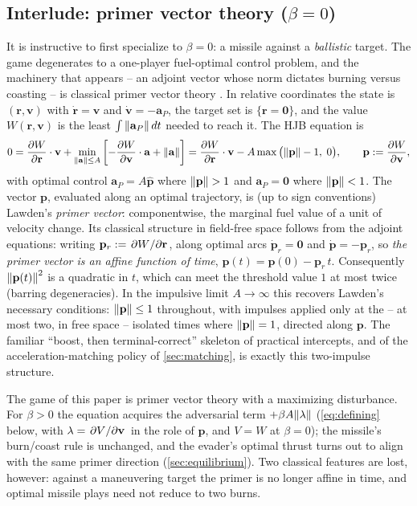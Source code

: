 \documentclass{article}
\newcommand{\eqdef}{:=}
\renewcommand{\vec}[1]{\mathbf{#1}}
\theoremstyle{remark}
\begin{document}
\subsection{Interlude: primer vector theory ($\beta = 0$)}
\label{sec:primer}

It is instructive to first specialize to $\beta = 0$: a missile against a
\emph{ballistic} target.  The game degenerates to a one-player fuel-optimal
control problem, and the machinery that appears -- an adjoint vector whose
norm dictates burning versus coasting -- is classical primer vector theory
\cite{lawden1963}.  In relative coordinates the state is $(\vec r, \vec v)$
with $\dot{\vec r} = \vec v$ and $\dot{\vec v} = -\vec a_P$, the target set
is $\{\vec r = \vec 0\}$, and the value $W(\vec r, \vec v)$ is the least
$\int \norm{\vec a_P}\, dt$ needed to reach it.  The HJB equation is
\[
  0 = \pdv{W}{\vec r}\cdot\vec v
  + \min_{\norm{\vec a} \le A} \left[ -\pdv{W}{\vec v}\cdot \vec a +
    \norm{\vec a} \right]
  = \pdv{W}{\vec r}\cdot\vec v - A \max\big( \norm{\vec p} - 1, \; 0 \big),
  \qquad \vec p \eqdef \pdv{W}{\vec v},
\]
with optimal control $\vec a_P = A\hat{\vec p}$ where $\norm{\vec p} > 1$ and
$\vec a_P = \vec 0$ where $\norm{\vec p} < 1$.  The vector $\vec p$,
evaluated along an optimal trajectory, is (up to sign conventions) Lawden's
\emph{primer vector}: componentwise, the marginal fuel value of a unit of
velocity change.  Its classical structure in field-free space follows from
the adjoint equations: writing $\vec p_r \eqdef \pdv*{W}{\vec r}$, along
optimal arcs $\dot{\vec p}_r = \vec 0$ and $\dot{\vec p} = -\vec p_r$, so
\emph{the primer vector is an affine function of time},
$\vec p(t) = \vec p(0) - \vec p_r\, t$.  Consequently $\norm{\vec p(t)}^2$ is
a quadratic in $t$, which can meet the threshold value $1$ at most twice
(barring degeneracies).  In the impulsive limit $A \to \infty$ this recovers
Lawden's necessary conditions: $\norm{\vec p} \le 1$ throughout, with
impulses applied only at the -- at most two, in free space -- isolated times
where $\norm{\vec p} = 1$, directed along $\vec p$.  The familiar ``boost,
then terminal-correct'' skeleton of practical intercepts, and of the
acceleration-matching policy of \cref{sec:matching}, is exactly this
two-impulse structure.

The game of this paper is primer vector theory with a maximizing
disturbance.  For $\beta > 0$ the equation acquires the adversarial term
$+\beta A \norm{\vec\lambda}$ (\cref{eq:defining} below, with
$\vec\lambda = \pdv*{V}{\vec v}$ in the role of $\vec p$, and $V = W$ at
$\beta = 0$); the missile's burn/coast rule is unchanged, and the evader's
optimal thrust turns out to align with the same primer direction
(\cref{sec:equilibrium}).  Two classical features are lost, however: against
a maneuvering target the primer is no longer affine in time, and optimal
missile plays need not reduce to two burns.
\end{document}
